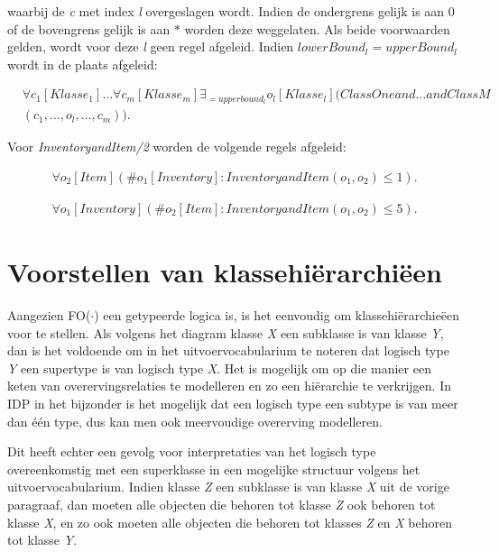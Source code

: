 waarbij de \textit{c} met index \textit{l} overgeslagen wordt. Indien de ondergrens gelijk is aan $0$ of de bovengrens gelijk is aan $*$ worden deze weggelaten. Als beide voorwaarden gelden, wordt voor deze \textit{l} geen regel afgeleid. Indien $lowerBound_l = upperBound_l$ wordt in de plaats afgeleid:
	
	\begin{align*}
	&\forall{c_1}[Klasse_1]\ldots\forall{c_m}[Klasse_m] \exists_{=upperbound_l}o_l[Klasse_l](ClassOneand\ldots{}andClassM\\&(c_1,\ldots,o_l,\ldots,c_m)).
	\end{align*}
	
	Voor \textit{InventoryandItem/2} worden de volgende regels afgeleid:
	
\begin{align*}
		\forall{o_2}[Item](\#{o_1[Inventory]: InventoryandItem(o_1,o_2)} \leq 1).
\end{align*} 
		
\begin{align*}
		\forall{o_1}[Inventory](\#{o_2[Item]: InventoryandItem(o_1,o_2)} \leq 5).
\end{align*}

\section{Voorstellen van klassehi\"erarchi\"een}\label{sec:hierarchies}
Aangezien FO($\cdot$) een getypeerde logica is, is het eenvoudig om klassehi\"erarchie\"een voor te stellen. Als volgens het diagram klasse \textit{X} een subklasse is van klasse \textit{Y}, dan is het voldoende om in het uitvoervocabularium te noteren dat logisch type \textit{Y} een supertype is van logisch type \textit{X}. Het is mogelijk om op die manier een keten van overervingsrelaties te modelleren en zo een hi\"erarchie te verkrijgen. In IDP in het bijzonder is het mogelijk dat een logisch type een subtype is van meer dan \'e\'en type, dus kan men ook meervoudige overerving modelleren.

Dit heeft echter een gevolg voor interpretaties van het logisch type overeenkomstig met een superklasse in een mogelijke structuur volgens het uitvoervocabularium. Indien klasse \textit{Z} een subklasse is van klasse \textit{X} uit de vorige paragraaf, dan moeten alle objecten die behoren tot klasse \textit{Z} ook behoren tot klasse \textit{X}, en zo ook moeten alle objecten die behoren tot klasses \textit{Z} en \textit{X} behoren tot klasse \textit{Y}.

